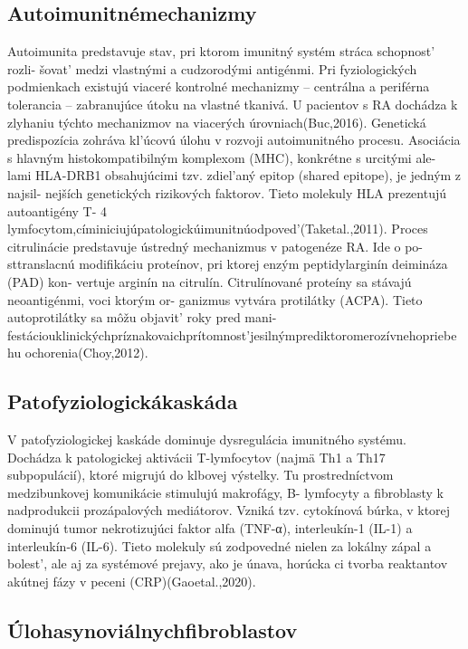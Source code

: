 \subsection{Autoimunitnémechanizmy}

Autoimunita predstavuje stav, pri ktorom imunitný systém stráca schopnost’ rozli- šovat’ medzi vlastnými a cudzorodými antigénmi. Pri fyziologických podmienkach existujú viaceré kontrolné mechanizmy -- centrálna a periférna tolerancia -- zabranujúce útoku na vlastné tkanivá. U pacientov s RA dochádza k zlyhaniu týchto mechanizmov na viacerých úrovniach(Buc,2016). Genetická predispozícia zohráva kl’úcovú úlohu v rozvoji autoimunitného procesu. Asociácia s hlavným histokompatibilným komplexom (MHC), konkrétne s urcitými ale- lami HLA-DRB1 obsahujúcimi tzv. zdiel’aný epitop (shared epitope), je jedným z najsil- nejších genetických rizikových faktorov. Tieto molekuly HLA prezentujú autoantigény T- 4 lymfocytom,címiniciujúpatologickúimunitnúodpoved’(Taketal.,2011). Proces citrulinácie predstavuje ústredný mechanizmus v patogenéze RA. Ide o po- sttranslacnú modifikáciu proteínov, pri ktorej enzým peptidylarginín deimináza (PAD) kon- vertuje arginín na citrulín. Citrulínované proteíny sa stávajú neoantigénmi, voci ktorým or- ganizmus vytvára protilátky (ACPA). Tieto autoprotilátky sa môžu objavit’ roky pred mani- festáciouklinickýchpríznakovaichprítomnost’jesilnýmprediktoromerozívnehopriebehu ochorenia(Choy,2012).


\subsection{Patofyziologickákaskáda}

V patofyziologickej kaskáde dominuje dysregulácia imunitného systému. Dochádza k patologickej aktivácii T-lymfocytov (najmä Th1 a Th17 subpopulácií), ktoré migrujú do klbovej výstelky. Tu prostredníctvom medzibunkovej komunikácie stimulujú makrofágy, B- lymfocyty a fibroblasty k nadprodukcii prozápalových mediátorov. Vzniká tzv. cytokínová búrka, v ktorej dominujú tumor nekrotizujúci faktor alfa (TNF-α), interleukín-1 (IL-1) a interleukín-6 (IL-6). Tieto molekuly sú zodpovedné nielen za lokálny zápal a bolest’, ale aj za systémové prejavy, ako je únava, horúcka ci tvorba reaktantov akútnej fázy v peceni (CRP)(Gaoetal.,2020).


\subsection{Úlohasynoviálnychfibroblastov}


